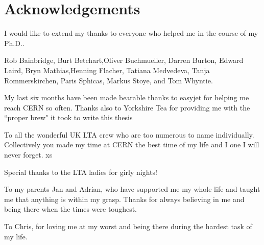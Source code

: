 \chapter*{Acknowledgements}

\noindent

\normalsize

I would like to extend my thanks to everyone who helped me in the course of my Ph.D.. 

 Rob Bainbridge, Burt Betchart,Oliver Buchmueller, Darren Burton, Edward Laird, Bryn Mathias,Henning
Flacher,  Tatiana Medvedeva, Tanja Rommerskirchen,
Paris Sphicas, Markus Stoye, and Tom Whyntie.

My last six months have been made bearable thanks to easyjet for helping me reach CERN so often. Thanks also to Yorkshire Tea for providing me with the ``proper brew" it took to write this thesis

To all the wonderful UK LTA crew who are too numerous to name individually. Collectively you made my time at CERN the best time of my life and I one I will never forget. xs

Special thanks to the LTA ladies for girly nights! 

To my parents Jan and Adrian, who have supported me my whole life and taught me that anything is within my grasp. Thanks for always believing in me and being there when the times were toughest. 

To Chris, for loving me at my worst and being there during the hardest task of my life.

